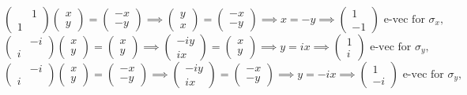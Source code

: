 \documentclass[11pt, letterpaper]{article}
\begin{document}
\[
	\begin{pmatrix}
	 & 1 \\
	1 & 
	\end{pmatrix}\begin{pmatrix}
	x \\
	y
	\end{pmatrix}=\begin{pmatrix}
	-x \\
	-y
	\end{pmatrix}\implies \begin{pmatrix}
	y \\
	x
	\end{pmatrix}=\begin{pmatrix}
	-x \\
	-y
	\end{pmatrix}\implies x=-y \implies \begin{pmatrix}
	1 \\
	-1
	\end{pmatrix}\text{ e-vec for } \sigma _x,
\]
\[
	\begin{pmatrix}
	 & -i \\
	i & 
	\end{pmatrix}\begin{pmatrix}
	x \\
	y
	\end{pmatrix}=\begin{pmatrix}
	x \\
	y
	\end{pmatrix}\implies \begin{pmatrix}
	-iy \\
	ix
	\end{pmatrix}=\begin{pmatrix}
	x \\
	y
	\end{pmatrix}\implies y=ix \implies \begin{pmatrix}
	1 \\
	i
	\end{pmatrix}\text{ e-vec for } \sigma _y,
\]
\[
	\begin{pmatrix}
	 & -i \\
	i & 
	\end{pmatrix}\begin{pmatrix}
	x \\
	y
	\end{pmatrix}=\begin{pmatrix}
	-x \\
	-y
	\end{pmatrix}\implies \begin{pmatrix}
	-iy \\
	ix
	\end{pmatrix}=\begin{pmatrix}
	-x \\
	-y
	\end{pmatrix}\implies y=-ix \implies \begin{pmatrix}
	1 \\
	-i
	\end{pmatrix}\text{ e-vec for } \sigma _y,
\]
\end{document}
